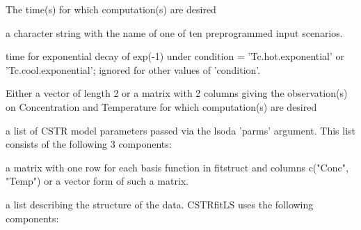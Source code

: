 \begin{Arguments}
\begin{ldescription}
\item[\code{Time}] The time(s) for which computation(s) are desired

\item[\code{condition}] a character string with the name of one of ten preprogrammed input
scenarios.  

\item[\code{ tau }] time for exponential decay of exp(-1) under condition =
'Tc.hot.exponential' or 'Tc.cool.exponential';  ignored for other
values of 'condition'. 

\item[\code{y}] Either a vector of length 2 or a matrix with 2 columns giving the
observation(s) on Concentration and Temperature for which
computation(s) are desired  

\item[\code{parms}] a list of CSTR model parameters passed via the lsoda 'parms'
argument.  This list consists of the following 3 components:  


\item[\code{coef}] a matrix with one row for each basis function in fitstruct and
columns c("Conc", "Temp") or a vector form of such a matrix.  

\item[\code{datstruct}] a list describing the structure of the data.  CSTRfitLS uses the
following components:

\end{ldescription}
\end{Arguments}
